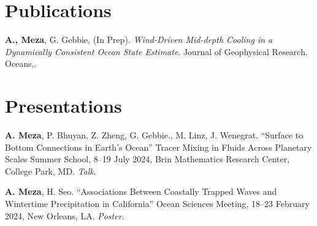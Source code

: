 \documentclass[letterpaper,11pt]{article}
\makeatletter
\newcommand{\resumeItem}[1]{
  \item\small{
    {#1 \vspace{-2pt}}
  }
}
\newcommand{\resumeProjectHeading}[2]{
    \item
    \begin{tabular*}{0.97\textwidth}{l@{\extracolsep{\fill}}r}
      \small#1 & #2 \\
    \end{tabular*}\vspace{-7pt}
}
\newcommand{\resumeSubHeadingListStart}{\begin{itemize}[leftmargin=0.15in, label={}]}
\newcommand{\resumeSubHeadingListEnd}{\end{itemize}}
\newcommand{\resumeItemListStart}{\begin{itemize}}
\newcommand{\resumeItemListEnd}{\end{itemize}\vspace{-5pt}}
\makeatother
\begin{document}


\section{Publications}
\textbf{A., Meza}, G. Gebbie, (In Prep). \textit{Wind-Driven Mid-depth Cooling in a Dynamically Consistent Ocean State Estimate}. Journal of Geophysical Research. Oceans,.

\section{Presentations}
\textbf{A. Meza}, P. Bhuyan, Z. Zheng, G. Gebbie., M. Linz, J. Wenegrat.  ``Surface to Bottom Connections in Earth's Ocean'' Tracer Mixing in Fluids Across Planetary Scales Summer School, 8–19 July 2024, Brin Mathematics Research Center, College Park, MD. \textit{Talk}.

\textbf{A. Meza}, H. Seo. ``Associations Between Coastally Trapped Waves and Wintertime Precipitation in California'' Ocean Sciences Meeting, 18–23 February 2024, New Orleans, LA. \textit{Poster}.
\end{document}
